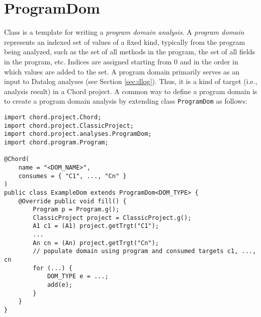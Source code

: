 
\section{ProgramDom}
\label{sec:program-dom}

Class 
is a template for writing a {\it program domain analysis}.
A {\it program domain} represents an indexed set of values of a fixed
kind, typically from the program being analyzed, such as the set of all methods
in the program, the set of all fields in the program, etc.  Indices are 
assigned starting from 0 and in the order in which values are added to the set.
A program domain primarily serves as an input to Datalog analyses
(see Section \ref{sec:dlog}).  Thus, it is a kind of target (i.e.,
analysis result) in a Chord project.  A common way to define a program domain
is to create a program domain analysis by extending class {\tt ProgramDom} as
follows:

\begin{framed}
\begin{verbatim}
import chord.project.Chord;
import chord.project.ClassicProject;
import chord.project.analyses.ProgramDom;
import chord.program.Program;

@Chord(
    name = "<DOM_NAME>",
    consumes = { "C1", ..., "Cn" }
)
public class ExampleDom extends ProgramDom<DOM_TYPE> {
    @Override public void fill() {
        Program p = Program.g();
        ClassicProject project = ClassicProject.g();
        A1 c1 = (A1) project.getTrgt("C1");
        ...
        An cn = (An) project.getTrgt("Cn");
        // populate domain using program and consumed targets c1, ..., cn
        for (...) {
            DOM_TYPE e = ...;
            add(e); 
        }
    }
}
\end{verbatim}
\end{framed}

